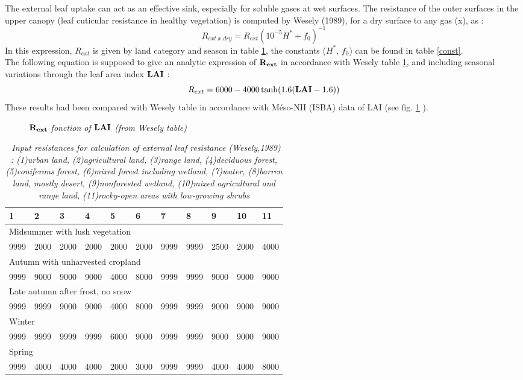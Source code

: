 The external leaf uptake can act as an effective sink, especially for soluble
gases at wet surfaces. 
The resistance of the outer surfaces in the upper canopy (leaf cuticular
resistance in healthy vegetation) is computed by Wesely (1989), for a
dry surface to any gas (x), as :
\[R_{ext.x.dry}=R_{ext}(10^{-5}H^*+f_0)^{-1}\]
In this expression, $R_{ext}$ is given by land category and season in table
\ref{resdebase},  the constants ($H^*$, $f_0$) can be found in table 
\ref{const}.\\
The following equation is supposed to give an analytic expression of
$\bf{R_{ext}}$ in accordance with Wesely table \ref{resdebase}, and 
including seasonal variations through the leaf area index $\bf LAI$ :
\[R_{ext}=6000 - 4000 \tanh(1.6( {\bf{LAI}} -1.6))\]
These results had been compared with Wesely table in accordance with 
M\'eso-NH (ISBA) data of LAI (see fig. \ref{lai_rext} ).
\begin{figure}
\centerline{}
\label{lai_rext}
\caption{\sl{$\bf{R_{ext}}$ fonction of $\bf{LAI}$ (from Wesely table)}}
\end{figure}

\begin{table}
\begin{center}
\begin{tabular}{lllllllllll}
\hline
1&2&3&4&5&6&7&8&9&10&11 \\ \hline
\multicolumn{11}{l}{Midsummer with lush vegetation}\\
9999 & 2000& 2000&   2000   & 2000  & 2000  & 9999 & 9999 & 2500 & 2000 & 4000
\\
\multicolumn{11}{l}{Autumn with unharvested cropland}\\
9999 & 9000& 9000&   9000   & 4000  & 8000  & 9999 & 9999 & 9000 & 9000 & 9000
\\
\multicolumn{11}{l}{Late autumn after frost, no snow}\\
9999 & 9999 & 9000&   9000   & 4000  & 8000  & 9999 & 9999 & 9000 & 9000 & 9000
\\
\multicolumn{11}{l}{Winter}\\
9999 & 9999 & 9999 & 9999 & 6000  & 9000  & 9999 & 9999 & 9000 & 9000 & 9000
\\
\multicolumn{11}{l}{Spring}\\
9999 & 4000& 4000&   4000   & 2000  & 3000  & 9999& 9999&  4000 & 4000 & 8000
\\ \hline
\end{tabular}
\caption { \sl~{Input resistances for calculation of external leaf resistance
(Wesely,1989) : (1)urban land, (2)agricultural land, (3)range land,
(4)deciduous forest, (5)coniferous forest, (6)mixed forest
including wetland, (7)water, (8)barren land, mostly desert,
(9)nonforested wetland, (10)mixed agricultural and range land,
(11)rocky-open areas with low-growing shrubs}} 
\label{resdebase}

\end{center}
\end{table}

